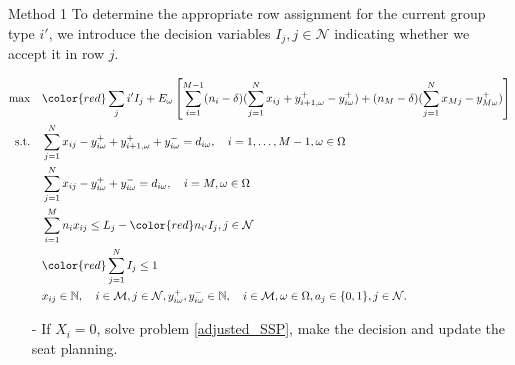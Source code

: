   \begin{frame}{Method 1}
    \scriptsize
    To determine the appropriate row assignment for the current group type $i{'}$, we introduce the decision variables $I_j, j \in \mathcal{N}$ indicating whether we accept it in row $j$.
    
      \begin{tiny}
        \begin{equation}\label{adjusted_SSP}
        \begin{aligned}
        \max \quad & {\color{red}\sum_{j} i{'} I_j} + E_{\omega}\left[\sum_{i=1}^{M-1} (n_i-\delta) (\sum_{j= 1}^{N} x_{ij} + y_{i+1,\omega}^{+} - y_{i \omega}^{+}) + (n_{M}-\delta) (\sum_{j= 1}^{N} x_{Mj} - y_{M \omega}^{+})\right] \\
        \text {s.t.} \quad & \sum_{j= 1}^{N} x_{ij}-y_{i \omega}^{+}+
        y_{i+1, \omega}^{+} + y_{i \omega}^{-}=d_{i \omega}, \quad i = 1,\ldots,M-1, \omega \in \Omega \\
        & \sum_{j= 1}^{N} x_{ij} -y_{i \omega}^{+}+y_{i \omega}^{-}=d_{i \omega}, \quad i = M, \omega \in \Omega \\
        & \sum_{i=1}^{M} n_{i} x_{ij} \leq L_j - {\color{red}n_{i{'}} I_j}, j \in \mathcal{N} \\
        & {\color{red}\sum_{j=1}^{N} I_j \leq 1} \\
        & x_{ij} \in \mathbb{N}, \quad i \in \mathcal{M}, j \in \mathcal{N}, y_{i \omega}^{+}, y_{i \omega}^{-} \in \mathbb{N}, \quad i \in \mathcal{M}, \omega \in \Omega,  a_j \in \{0,1\}, j \in \mathcal{N}.
        \end{aligned}
      \end{equation}
    \end{tiny}
    \begin{itemize}      
      \item[-] If $X_i = 0$, solve problem \eqref{adjusted_SSP}, make the decision and update the seat planning.
    \end{itemize}
  \end{frame}

      
      
